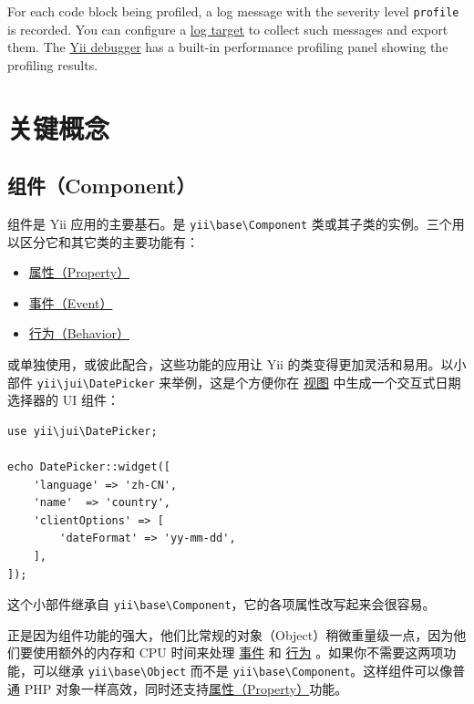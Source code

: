 For each code block being profiled, a log message with the severity level \lstinline|profile| is recorded. You can configure
a \hyperref[runtime-logging.md::::log-targets]{log target} to collect such messages and export them. The \hyperref[tool-debugger.md]{Yii debugger} has
a built-in performance profiling panel showing the profiling results.



\chapter{关键概念}
\label{concept-components.md}\section{组件（Component）}
组件是 Yii 应用的主要基石。是 \texttt{yii{\allowbreak{}\textbackslash}base{\allowbreak{}\textbackslash}Component} 类或其子类的实例。三个用以区分它和其它类的主要功能有：

\begin{itemize}
\item \hyperref[concept-properties.md]{属性（Property）}
\item \hyperref[concept-events.md]{事件（Event）}
\item \hyperref[concept-behaviors.md]{行为（Behavior）}
\end{itemize}
或单独使用，或彼此配合，这些功能的应用让 Yii 的类变得更加灵活和易用。以小部件 \texttt{yii{\allowbreak{}\textbackslash}jui{\allowbreak{}\textbackslash}DatePicker} 来举例，这是个方便你在 \hyperref[structure-view.md]{视图} 中生成一个交互式日期选择器的 UI 组件：

\lstset{language=php}\begin{lstlisting}
use yii\jui\DatePicker;

echo DatePicker::widget([
    'language' => 'zh-CN',
    'name'  => 'country',
    'clientOptions' => [
        'dateFormat' => 'yy-mm-dd',
    ],
]);
\end{lstlisting}
这个小部件继承自 \texttt{yii{\allowbreak{}\textbackslash}base{\allowbreak{}\textbackslash}Component}，它的各项属性改写起来会很容易。

正是因为组件功能的强大，他们比常规的对象（Object）稍微重量级一点，因为他们要使用额外的内存和 CPU 时间来处理 \hyperref[concept-events.md]{事件} 和 \hyperref[concept-behaviors.md]{行为} 。如果你不需要这两项功能，可以继承 \texttt{yii{\allowbreak{}\textbackslash}base{\allowbreak{}\textbackslash}Object} 而不是 \texttt{yii{\allowbreak{}\textbackslash}base{\allowbreak{}\textbackslash}Component}。这样组件可以像普通 PHP 对象一样高效，同时还支持\hyperref[concept-properties.md]{属性（Property）}功能。

